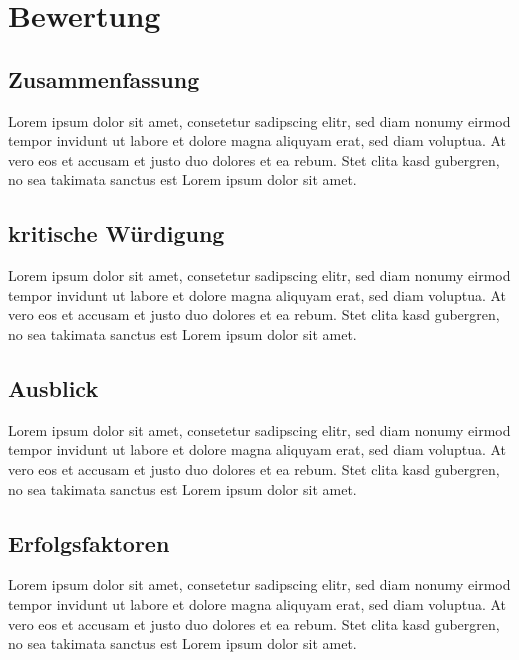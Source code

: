 \documentclass[a4paper,12pt]{article}
\begin{document}
\section{Bewertung}

\subsection{Zusammenfassung}
Lorem ipsum dolor sit amet, consetetur sadipscing elitr, sed diam nonumy eirmod tempor invidunt ut labore et dolore magna aliquyam erat, sed diam voluptua. At vero eos et accusam et justo duo dolores et ea rebum. Stet clita kasd gubergren, no sea takimata sanctus est Lorem ipsum dolor sit amet.

\subsection{kritische Würdigung}
Lorem ipsum dolor sit amet, consetetur sadipscing elitr, sed diam nonumy eirmod tempor invidunt ut labore et dolore magna aliquyam erat, sed diam voluptua. At vero eos et accusam et justo duo dolores et ea rebum. Stet clita kasd gubergren, no sea takimata sanctus est Lorem ipsum dolor sit amet.

\subsection{Ausblick}
Lorem ipsum dolor sit amet, consetetur sadipscing elitr, sed diam nonumy eirmod tempor invidunt ut labore et dolore magna aliquyam erat, sed diam voluptua. At vero eos et accusam et justo duo dolores et ea rebum. Stet clita kasd gubergren, no sea takimata sanctus est Lorem ipsum dolor sit amet.

\subsection{Erfolgsfaktoren}
Lorem ipsum dolor sit amet, consetetur sadipscing elitr, sed diam nonumy eirmod tempor invidunt ut labore et dolore magna aliquyam erat, sed diam voluptua. At vero eos et accusam et justo duo dolores et ea rebum. Stet clita kasd gubergren, no sea takimata sanctus est Lorem ipsum dolor sit amet.





\pagestyle{empty} 

\onehalfspacing

\thispagestyle{empty}
\clearpage
\end{document}
